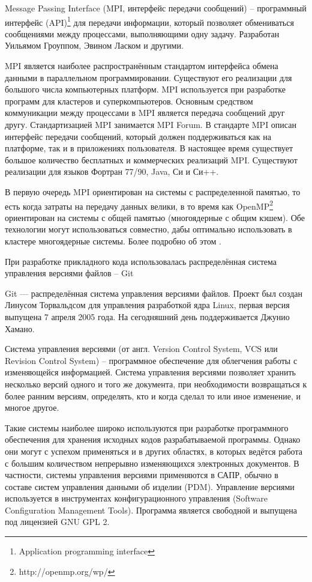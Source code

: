 Message Passing Interface (MPI, интерфейс передачи сообщений) -- программный интерфейс (API)\footnote{Application programming interface} для передачи информации, который позволяет обмениваться сообщениями между процессами, выполняющими одну задачу. Разработан Уильямом Гроуппом, Эвином Ласком и другими.

MPI является наиболее распространённым стандартом интерфейса обмена данными в параллельном программировании. Существуют его реализации для большого числа компьютерных платформ. MPI используется при разработке программ для кластеров и суперкомпьютеров. Основным средством коммуникации между процессами в MPI является передача сообщений друг другу. Стандартизацией MPI занимается MPI Forum. В стандарте MPI описан интерфейс передачи сообщений, который должен поддерживаться как на платформе, так и в приложениях пользователя. В настоящее время существует большое количество бесплатных и коммерческих реализаций MPI. Существуют реализации для языков Фортран 77/90, Java, Си и Си++.

В первую очередь MPI ориентирован на системы с распределенной памятью, то есть когда затраты на передачу данных велики, в то время как OpenMP\footnote{http://openmp.org/wp/} ориентирован на системы с общей памятью (многоядерные с общим кэшем). Обе технологии могут использоваться совместно, дабы оптимально использовать в кластере многоядерные системы. Более подробно об этом \cite{mpi:offsite}.

При разработке прикладного кода использовалась распределённая система управления версиями файлов -- Git

Git — распределённая система управления версиями файлов. Проект был создан Линусом Торвальдсом для управления разработкой ядра Linux, первая версия выпущена 7 апреля 2005 года. На сегодняшний день поддерживается Джунио Хамано.

Система управления версиями (от англ. Version Control System, VCS или Revision Control System) -- программное обеспечение для облегчения работы с изменяющейся информацией. Система управления версиями позволяет хранить несколько версий одного и того же документа, при необходимости возвращаться к более ранним версиям, определять, кто и когда сделал то или иное изменение, и многое другое.

Такие системы наиболее широко используются при разработке программного обеспечения для хранения исходных кодов разрабатываемой программы. Однако они могут с успехом применяться и в других областях, в которых ведётся работа с большим количеством непрерывно изменяющихся электронных документов. В частности, системы управления версиями применяются в САПР, обычно в составе систем управления данными об изделии (PDM). Управление версиями используется в инструментах конфигурационного управления (Software Configuration Management Tools).
Программа является свободной и выпущена под лицензией GNU GPL 2.

